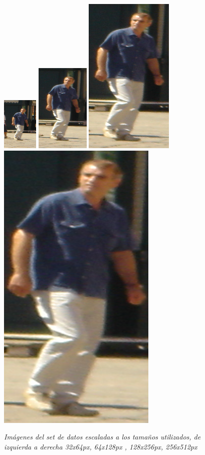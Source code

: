 \begin{figure}[H]
  \centering
  \includegraphics[scale=.3]{images/32}
  \includegraphics[scale=.3]{images/64}
  \includegraphics[scale=.3]{images/128}
  \includegraphics[scale=.3]{images/256}
  \caption{\em Imágenes  del set de datos escaladas a los tamaños utilizados, de izquierda a derecha 32x64px, 64x128px , 128x256px, 256x512px}  
  \label{fig:imgescalas}
\end{figure}

